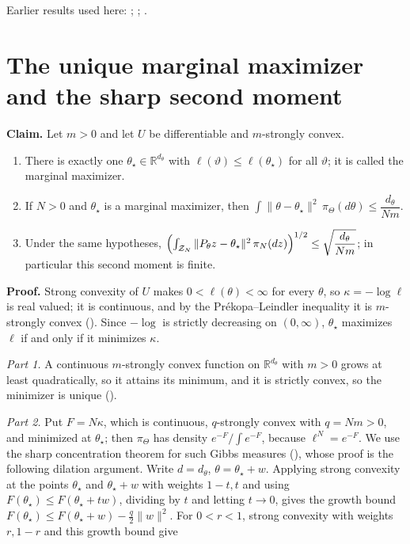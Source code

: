 \documentclass[11pt,a4paper]{article}
\begin{document}
Earlier results used here: \cite[Section~3.1.1]{LangevinLean2026IPLA}; \cite[Section~3.1.6]{LangevinLean2026IPLA}; \cite[Section~3.9.9]{LangevinLean2026IPLA}.

\section{\texorpdfstring{The unique marginal maximizer and the sharp second moment}{The unique marginal maximizer and the sharp second moment}}


\textbf{Claim.} Let \(m>0\) and let \(U\) be differentiable and \(m\)-strongly convex.



\begin{enumerate}


\item There is exactly one \(\theta_\star\in\mathbb R^{d_\theta}\) with \(\ell(\vartheta)\le\ell(\theta_\star)\) for all \(\vartheta\); it is called the marginal maximizer.

\item If \(N>0\) and \(\theta_\star\) is a marginal maximizer, then \(\int\|\theta-\theta_\star\|^2\,\pi_\Theta(d\theta)\le\dfrac{d_\theta}{Nm}\).

\item Under the same hypotheses, \(\Bigl(\int_{\mathcal Z_N}\|P_\theta z-\theta_\star\|^2\,\pi_N(dz)\Bigr)^{1/2}\le\sqrt{\dfrac{d_\theta}{Nm}}\); in particular this second moment is finite.

\end{enumerate}



\textbf{Proof.} Strong convexity of \(U\) makes \(0<\ell(\theta)<\infty\) for every \(\theta\), so \(\kappa=-\log\ell\) is real valued; it is continuous, and by the Prékopa–Leindler inequality it is \(m\)-strongly convex (\cite[Section~3.12.3]{LangevinLean2026IPLA}). Since \(-\log\) is strictly decreasing on \((0,\infty)\), \(\theta_\star\) maximizes \(\ell\) if and only if it minimizes \(\kappa\).




\emph{Part 1.} A continuous \(m\)-strongly convex function on \(\mathbb R^{d_\theta}\) with \(m>0\) grows at least quadratically, so it attains its minimum, and it is strictly convex, so the minimizer is unique (\cite[Section~3.12.4]{LangevinLean2026IPLA}).




\emph{Part 2.} Put \(F=N\kappa\), which is continuous, \(q\)-strongly convex with \(q=Nm>0\), and minimized at \(\theta_\star\); then \(\pi_\Theta\) has density \(e^{-F}/\int e^{-F}\), because \(\ell^N=e^{-F}\). We use the sharp concentration theorem for such Gibbs measures (\cite[Section~3.5.2]{LangevinLean2026Proximal}), whose proof is the following dilation argument. Write \(d=d_\theta\), \(\theta=\theta_\star+w\). Applying strong convexity at the points \(\theta_\star\) and \(\theta_\star+w\) with weights \(1-t,t\) and using \(F(\theta_\star)\le F(\theta_\star+tw)\), dividing by \(t\) and letting \(t\to0\), gives the growth bound \(F(\theta_\star)\le F(\theta_\star+w)-\frac q2\|w\|^2\). For \(0<r<1\), strong convexity with weights \(r,1-r\) and this growth bound give
\end{document}
